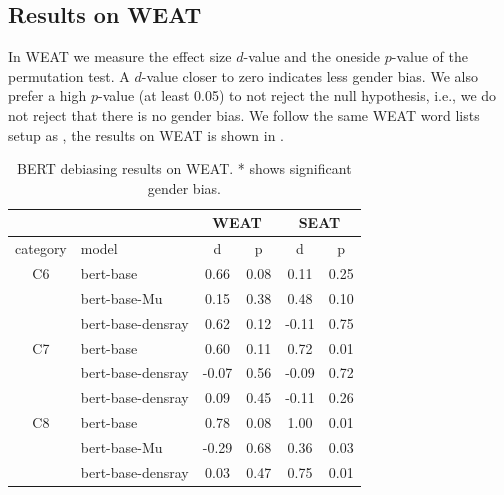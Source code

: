 \subsection{Results on WEAT}
In WEAT we measure the effect size $d$-value and the oneside $p$-value of the permutation test.
A $d$-value closer to zero indicates less gender bias.  We also prefer a high $p$-value (at least 0.05) to not reject the null hypothesis, i.e., we do not reject that there is no gender bias. We follow the same WEAT word lists setup as \citet{karve2019conceptor}, the results on WEAT is shown in .
\begin{table}[ht]
\centering
\scriptsize
\begin{tabular}{clcccc}
\hline
&&\multicolumn{2}{c}{WEAT}&\multicolumn{2}{c}{SEAT}\\
\hline
category & model & d & p& d & p\\
\hline
C6 & bert-base & 0.66 & 0.08 &0.11&0.25\\
& bert-base-Mu & 0.15 & 0.38&0.48&0.10\\
&bert-base-densray & 0.62 & 0.12&-0.11&0.75\\
\hline
C7 & bert-base & 0.60 & 0.11 &0.72&0.01\\
& bert-base-densray & -0.07 & 0.56&-0.09&0.72\\
& bert-base-densray & 0.09 & 0.45&-0.11&0.26\\
\hline
C8& bert-base & 0.78 & 0.08 &1.00&0.01\\
& bert-base-Mu & -0.29 & 0.68&0.36&0.03\\
& bert-base-densray & 0.03 & 0.47&0.75&0.01\\

\hline
\end{tabular}
\caption{
BERT debiasing results on WEAT. * shows significant gender bias.}
\end{table}
